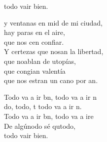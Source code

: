 \begin{cancion}
\begin{chorus}
	todo vair bien.\\
	\end{chorus}%
	y ventanas en mid de mi ciudad,\\
	hay paras en el aire,\\
	que nos cen confiar.\\
	Y certezas que nosan la libertad,\\
	que noablan de utopías,\\
	que congian valentía\\
	que nos estran un cano por an.\\
	\begin{chorus}%
	Todo va a ir bn, todo va a ir n\\
	do, todo, t todo va a ir n.\\
	Todo va a ir bn, todo va a ire\\
	De algúnodo sé qutodo,\\
	todo vair bien.\\
	\end{chorus}%
\end{cancion}%
